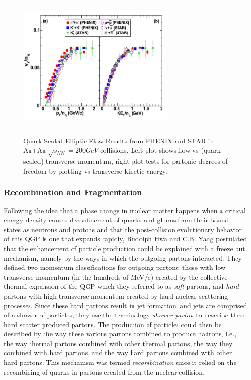 \begin{figure}[htbp!]
  \centering    \rule{35em}{0.5pt}
    \includegraphics[width=0.7\textwidth]{prevplots/quarkscaledv2.JPG}

  \caption[Quark Scaled Elliptic Flow Results from PHENIX and STAR in Au+Au $\sqrt{s_NN}=200 GeV$ collisions]{Quark Scaled Elliptic Flow Results from PHENIX and STAR\citep{velkovska:lec12} in Au+Au $\sqrt{s_{NN}}=200 GeV$ collisions. Left plot shows flow vs (quark scaled) transverse momentum, right plot tests for partonic degrees of freedom by plotting vs transverse kinetic energy.}
  \label{fig:quarkscaledv2}    \rule{35em}{0.5pt}
\end{figure} 

\subsubsection{Recombination and Fragmentation}
Following the idea that a phase change in nuclear matter happens when a critical energy density causes deconfinement of quarks and gluons from their bound states as neutrons and protons and that the post-collision evolutionary behavior of this QGP is one that expands rapidly, Rudolph Hwa and C.B. Yang postulated that the enhancement of particle production could be explained with a freeze out mechanism, namely by the ways in which the outgoing partons interacted\citep{PhysRevC.70.024905}. They defined two momentum classifications for outgoing partons: those with low transverse momentum (in the hundreds of MeV/c) created by the collective thermal expansion of the QGP which they referred to as \textit{soft} partons, and \textit{hard} partons with high transverse momentum created by hard nuclear scattering processes. Since these hard partons result in jet formation, and jets are comprised of a shower of particles, they use the terminology \textit{shower parton} to describe these hard scatter produced partons. The production of particles could then be described by the way these various partons combined to produce hadrons, i.e., the way thermal partons combined with other thermal partons, the way they combined with hard partons, and the way hard partons combined with other hard partons. This mechanism was termed \textit{recombination} since it relied on the recombining of quarks in partons created from the nuclear collision.

